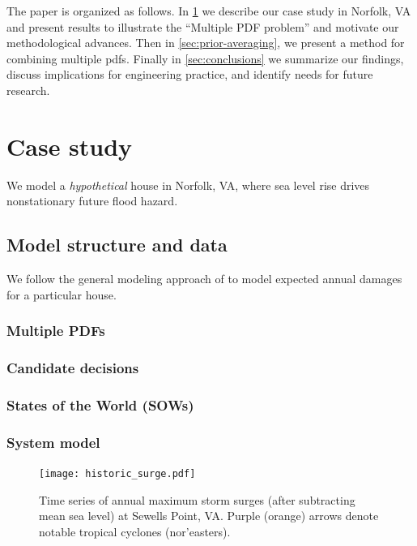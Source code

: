 \documentclass[12pt]{article}
\begin{document}
The paper is organized as follows.
In \cref{sec:case-study} we describe our case study in Norfolk, VA and present results to illustrate the ``Multiple PDF problem'' and motivate our methodological advances.
Then in \cref{sec:prior-averaging}, we present a method for combining multiple \glspl{pdf}.
Finally in \cref{sec:conclusions} we summarize our findings, discuss implications for engineering practice, and identify needs for future research.

\section{Case study}\label{sec:case-study}

We model a \emph{hypothetical} house in Norfolk, VA, where sea level rise drives nonstationary future flood hazard.

\subsection{Model structure and data}

We follow the general modeling approach of \citet{zarekarizi_suboptimal:2020} to model expected annual damages for a particular house.

\subsubsection{Multiple PDFs}

\subsubsection{Candidate decisions}

\subsubsection{States of the World (SOWs)}

\subsubsection{System model}

\begin{figure}
    \centering
    \texttt{[image: historic\_surge.pdf]}
    \caption{
        Time series of annual maximum storm surges (after subtracting mean sea level) at Sewells Point, VA.
        Purple (orange) arrows denote notable tropical cyclones (nor'easters).
    }
    \label{fig:observations}
\end{figure}
\end{document}
